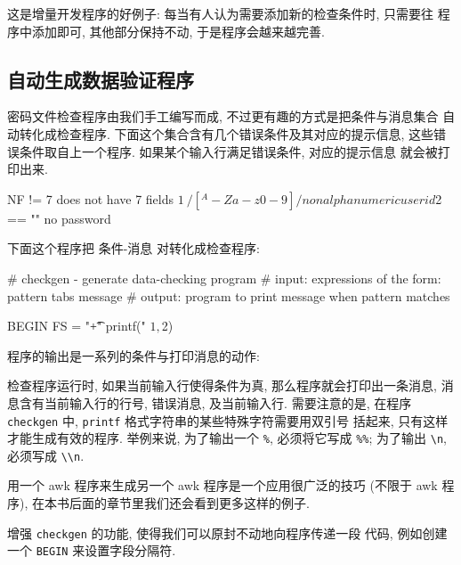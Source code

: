 \begin{shell}
这是增量开发程序的好例子: 每当有人认为需要添加新的检查条件时, 只需要往
程序中添加即可, 其他部分保持不动, 于是程序会越来越完善.

\subsection{自动生成数据验证程序}
\label{subsec:generating_data_validation_programs}

密码文件检查程序由我们手工编写而成, 不过更有趣的方式是把条件与消息集合
自动转化成检查程序. 下面这个集合含有几个错误条件及其对应的提示信息, 
这些错误条件取自上一个程序. 如果某个输入行满足错误条件, 对应的提示信息
就会被打印出来.
\begin{shell}
    NF != 7			does not have 7 fields
    $1 ~ /[^A-Za-z0-9]/	nonalphanumeric user id
    $2 == ""		no password
\end{shell}
下面这个程序把 条件-消息 对转化成检查程序:
\begin{awkcode}
    # checkgen - generate data-checking program
    #     input:  expressions of the form: pattern tabs message
    #     output: program to print message when pattern matches
    
    BEGIN { FS = "\t+" }
    { printf("%
          $1, $2)
    }
\end{awkcode}
程序的输出是一系列的条件与打印消息的动作:
检查程序运行时, 如果当前输入行使得条件为真, 那么程序就会打印出一条消息, 
消息含有当前输入行的行号, 错误消息, 及当前输入行. 需要注意的是, 在程序
\verb'checkgen' 中, \verb'printf' 格式字符串的某些特殊字符需要用双引号
括起来, 只有这样才能生成有效的程序. 举例来说, 为了输出一个 \verb'%',
必须将它写成 \verb'%%'; 为了输出 \verb'\n', 必须写成 \verb'\\n'.

用一个 awk 程序来生成另一个 awk 程序是一个应用很广泛的技巧 (不限于 awk
程序), 在本书后面的章节里我们还会看到更多这样的例子.

\begin{exercise}
    增强 \verb'checkgen' 的功能, 使得我们可以原封不动地向程序传递一段
    代码, 例如创建一个 \verb'BEGIN' 来设置字段分隔符.
\end{exercise}


\end{shell}
